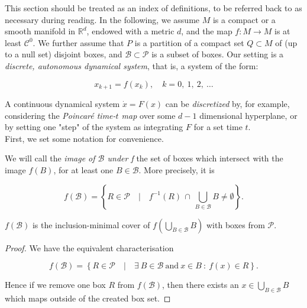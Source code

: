 This section should be treated as an index of definitions, to be referred back to as 
necessary during reading. In the following, we assume $M$ is a compact or a smooth manifold 
in $\mathbb{R}^d$, endowed with a metric $d$, and the 
map $f: M \to M$ is at least $\mathcal{C}^0$. We further assume that $P$ is a partition 
of a compact set $Q \subset M$ of (up to a null set) disjoint boxes, and 
$\mathcal{B} \subset \mathcal{P}$ is a subset of boxes. Our setting is a 
\emph{discrete, autonomous dynamical system}, that is, a system of the form:

\begin{equation}
    x_{k+1} = f(x_k), \quad k = 0,\ 1,\ 2,\ \dotsc
\end{equation}

A continuous dynamical system $\dot{x} = F(x)$ can be \emph{discretized} by, for example,
considering the \emph{Poincaré time-$t$ map} over some $d-1$ dimensional hyperplane,
or by setting one "step" of the system as integrating $F$ for a set time $t$. \\

First, we set some notation for convenience.

\begin{definition}
    We will call the \emph{image of $\mathcal{B}$ under f} 
    the set of boxes which intersect with the image $f(B)$, for at least one 
    $B \in \mathcal{B}$. More precisely, it is 
    
    \begin{equation}
        f (\mathcal{B}) = \left\{
            R \in \mathcal{P} \quad \vert \quad 
            f^{-1} (R)\, \cap\, \bigcup\limits_{B \in \mathcal{B}} B \neq \emptyset
        \right\}.
    \end{equation}

\end{definition}

\begin{theorem}
    $f(\mathcal{B})$ is the inclusion-minimal cover of $f(\bigcup_{B \in \mathcal{B}} B)$
    with boxes from $\mathcal{P}$.
\end{theorem}

\begin{proof}
    We have the equivalent characterisation

    \begin{equation}
        f(\mathcal{B}) = \left\{
            R \in \mathcal{P} \quad \vert \quad
            \exists\ B \in \mathcal{B}\ \text{and}\ x \in B\ :\ f(x) \in R
        \right\}.
    \end{equation}

    Hence if we remove one box $R$ from $f(\mathcal{B})$, then there exists an 
    $x \in \bigcup_{B \in \mathcal{B}} B$ which maps outside of the created box set.

\end{proof}

